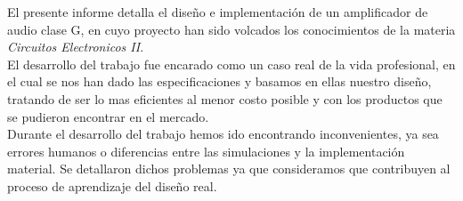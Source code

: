 \bigskip
	El presente informe detalla el diseño e implementación de un amplificador de audio clase G, en cuyo proyecto han sido volcados los conocimientos de la materia \emph{Circuitos Electronicos II}.\\
	
	El desarrollo del trabajo fue encarado como un caso real de la vida profesional, en el cual se nos han dado las especificaciones y basamos en ellas nuestro diseño, tratando de ser lo mas eficientes al menor costo posible y con los productos que se pudieron encontrar en el mercado.\\
	
	Durante el desarrollo del trabajo hemos ido encontrando inconvenientes, ya sea errores humanos o diferencias entre las simulaciones y la implementación material. Se detallaron dichos problemas ya que consideramos que contribuyen al proceso de aprendizaje del diseño real.\\